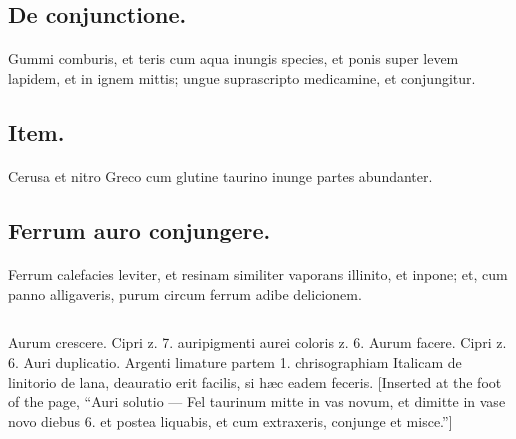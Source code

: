 \documentclass[a4paper, 11pt, oneside, polutonikogreek, italian]{article}
\begin{document}
\subsection{De conjunctione.}
\paragraph{}
Gummi comburis, et teris cum aqua inungis species, et ponis super levem lapidem, et in ignem mittis; ungue suprascripto medicamine, et conjungitur.

\subsection{Item.}
\paragraph{}
Cerusa et nitro Greco cum glutine taurino inunge partes abundanter.

\subsection{Ferrum auro conjungere.}
\paragraph{}
Ferrum calefacies leviter, et resinam similiter vaporans illinito, et inpone; et, cum panno alligaveris, purum circum ferrum adibe delicionem.

\subsection{}
\subsection{}
\subsection{}
\paragraph{}
Aurum crescere. Cipri z. 7. auripigmenti aurei coloris z. 6. Aurum facere. Cipri z. 6. Auri duplicatio. Argenti limature partem 1. chrisographiam Italicam de linitorio de lana, deauratio erit facilis, si hæc eadem feceris. [Inserted at the foot of the page, ``Auri solutio --- Fel taurinum mitte in vas novum, et dimitte in vase novo diebus 6. et postea liquabis, et cum extraxeris, conjunge et misce.'']
\end{document}
